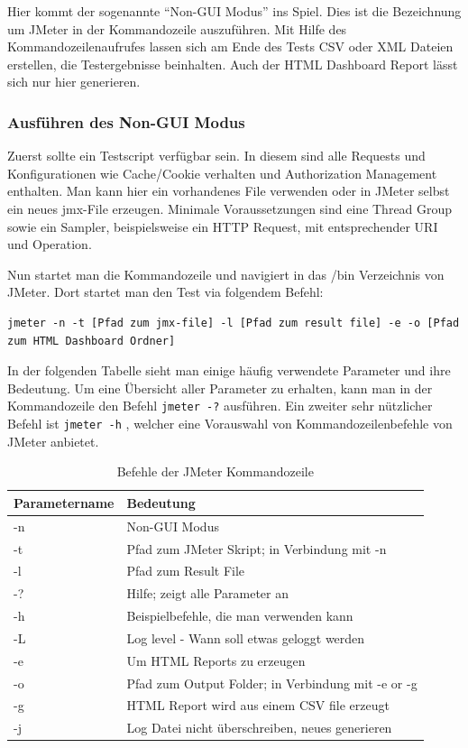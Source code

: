 \documentclass[a4paper,12pt]{article}
\newcommand{\codeInLine}[1]{%
\colorbox{graybackgroundColor}{\lstinline{#1}} %
}
\begin{document}
Hier kommt der sogenannte "`Non-GUI Modus"' ins Spiel. Dies ist die Bezeichnung um JMeter in der Kommandozeile auszuführen. Mit Hilfe des Kommandozeilenaufrufes lassen sich am Ende des Tests CSV oder XML Dateien erstellen, die Testergebnisse beinhalten. Auch der HTML Dashboard Report lässt sich nur hier generieren.

\subsubsection{Ausführen des Non-GUI Modus}
Zuerst sollte ein Testscript verfügbar sein. In diesem sind alle Requests und Konfigurationen wie Cache/Cookie verhalten und Authorization Management enthalten. Man kann hier ein vorhandenes File verwenden oder in JMeter selbst ein neues jmx-File erzeugen. Minimale Voraussetzungen sind eine Thread Group sowie ein Sampler, beispielsweise ein HTTP Request, mit entsprechender URI und Operation.

Nun startet man die Kommandozeile und navigiert in das /bin Verzeichnis von JMeter. Dort startet man den Test via folgendem Befehl:
\begin{lstlisting}
jmeter -n -t [Pfad zum jmx-file] -l [Pfad zum result file] -e -o [Pfad zum HTML Dashboard Ordner]
\end{lstlisting} 
In der folgenden Tabelle sieht man einige häufig verwendete Parameter und ihre Bedeutung. Um eine Übersicht aller Parameter zu erhalten, kann man in der Kommandozeile den Befehl \codeInLine{jmeter -?} ausführen. Ein zweiter sehr nützlicher Befehl ist \codeInLine{jmeter -h}, welcher eine Vorauswahl von Kommandozeilenbefehle von JMeter anbietet.
\begin{table}[H]
	\centering
	\begin{tabular}{|l|l|}
		\hline
		\textbf{Parametername} & \textbf{Bedeutung} \\
		\hline
		-n & Non-GUI Modus \\
		-t & Pfad zum JMeter Skript; in Verbindung mit -n \\
		-l & Pfad zum Result File \\
		-? & Hilfe; zeigt alle Parameter an \\
		-h & Beispielbefehle, die man verwenden kann \\
		-L & Log level - Wann soll etwas geloggt werden \\
		-e & Um HTML Reports zu erzeugen\\
		-o & Pfad zum Output Folder; in Verbindung mit -e or -g \\
		-g & HTML Report wird aus einem CSV file erzeugt \\ 
		-j & Log Datei nicht überschreiben, neues generieren \\
		\hline
	\end{tabular}
	\caption[tab_parameter_non_gui_all]{Befehle der JMeter Kommandozeile}
	\label{tab_parameter_non_gui_all}
\end{table}
\end{document}
